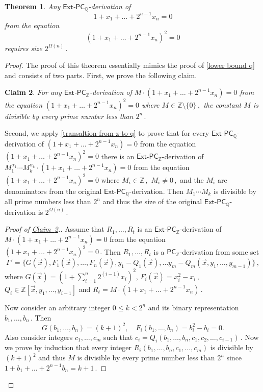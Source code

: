 \documentclass[11pt]{article}
\newcommand{\expref}[2]{\texorpdfstring{\hyperref[#2]{#1~\ref{#2}}}{#1~\ref{#2}}}
\newtheorem{theorem}{Theorem}[section]
\newtheorem{claim}[theorem]{Claim}
\newcommand{\Q}{{\mathbb Q}}
\newcommand{\Z}{{\mathbb Z}}
\begin{document}
\begin{theorem} \label{square root lower bound}
Any $\mathsf{Ext}$-$\mathsf{PC}_{\Q}$-derivation of 
$$
	1 + x_1 + \ldots + 2^{n - 1} x_n = 0
$$ 
from the equation 
$$
	(1 + x_1 + \ldots + 2^{n - 1} x_n)^2 = 0
$$
requires size %
$2^{\Omega(n)}\,.$ %
\end{theorem}
\begin{proof}
%
The proof of this theorem essentially mimics the proof of \autoref{lower bound q} and consists of two parts. First, we prove the following claim. %
\begin{claim}\label{small claim} 
For any $\mathsf{Ext}$-$\mathsf{PC}_{\Z}$-derivation of $M \cdot (1 + x_1 + \ldots + 2^{n - 1} x_n) = 0$ from the equation $(1 + x_1 + \ldots + 2^{n - 1} x_n)^2 = 0$ where %
$M \in \Z \setminus \{0\}\,,$ %
 the constant $M$ is divisible by every prime number less than %
$2^n\,.$ %
\end{claim}

%
Second, we apply \autoref{transaltion-from-z-to-q} to prove that for every $\mathsf{Ext}$-$\mathsf{PC}_{\Q}$-derivation of $(1 + x_1 + \ldots + 2^{n - 1} x_n) = 0$ from the equation $(1 + x_1 + \ldots + 2^{n - 1} x_n)^2 = 0$ there is an $\mathsf{Ext}$-$\mathsf{PC}_{\Z}$-derivation of  $M_1^{\alpha_1} \cdots M_k^{\alpha_k} \cdot (1 + x_1 + \ldots + 2^{n - 1} x_n) = 0$ from the equation $(1 + x_1 + \ldots + 2^{n - 1} x_n)^2 = 0$ where %
$M_i \in \Z\,,$ %
$M_i \neq 0\,,$ %
 and the $M_i$ are denominators from the original $\mathsf{Ext}$-$\mathsf{PC}_{\Q}$-derivation. Then $M_1 \cdots M_k$ is divisible by all prime numbers less than $2^n$ and thus the size of the original $\mathsf{Ext}$-$\mathsf{PC}_{\Q}$-derivation is %
$2^{\Omega(n)}\,.$ %
%

\begin{proof}[Proof of \expref{Claim}{small claim}.]
Assume that %
$R_1, \ldots, R_t$ %
 is an $\mathsf{Ext}$-$\mathsf{PC}_{\Z}$-derivation of $M \cdot (1 + x_1 + \ldots + 2^{n - 1} x_n) = 0$ from the equation %
$(1 + x_1 + \ldots + 2^{n - 1} x_n)^2 = 0\,.$ %
 Then %
$R_1, \ldots, R_t$ %
 is a $\mathsf{PC}_{\Z}$-derivation from some set
$$
%
\Gamma' = \{G(\vec x), F_1(\vec x), \ldots, F_n(\vec x), y_1 - Q_1(\vec x), \ldots y_m - Q_m(\vec x, y_1, \ldots, y_{m - 1})\}\,, %
$$
where %
$G(\vec x) = (1 + \sum_{i = 1}^n  %
 2^{(i - 1)} x_i)^2$, %
$F_i(\vec x) = x_i^2 - x_i\,,$ %
 $Q_i \in \Z[\vec x, y_1, \ldots, y_{i - 1}]$ and %
$R_t = M \cdot (1 + x_1 + \ldots + 2^{n - 1} x_n) \,.$ %

Now consider an arbitrary integer %
$0 \le k < 2^n$ and its binary representation %
$b_{1}, \ldots, b_{n}\,.$ %
 Then
$$
G(b_1, \ldots, b_n) = (k + 1)^2, \quad F_i(b_1, \ldots, b_n) = b_i^2 - b_i = 0.
$$
Also consider integers $c_1, \ldots, c_m$ such that %
$c_i = Q_i(b_1, \ldots, b_n, c_1, c_2, \ldots, c_{i - 1})\,.$ %
 Now we  prove by induction that every integer %
$R_i(b_1, \ldots, b_n, c_1, \ldots, c_m)$ is divisible by $(k + 1)^2$ and thus $M$ is divisible by every prime number less than $2^n$ since %
$1 + b_1 + \ldots + 2^{n - 1} b_n = k + 1\,.$ %


\end{proof}
\end{proof}
\end{document}
